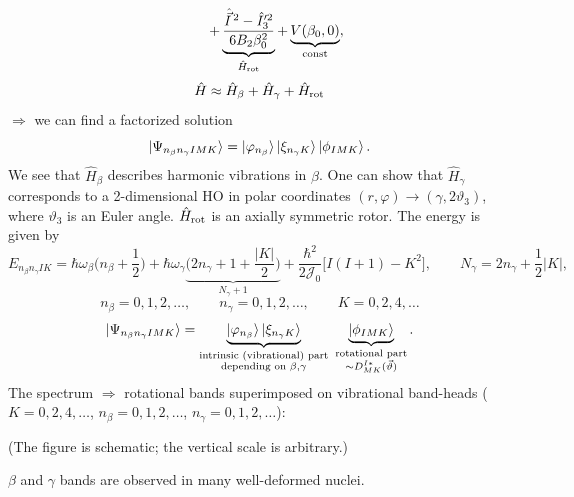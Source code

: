 \documentclass[11pt,a4paper]{article}
\newcommand{\op}[1]{\hat{#1}}
\begin{document}
\[
\qquad\ +\underbrace{\frac{\op{\vec I}^{\,2}-\op I'^2_3}{6B_2\beta_0^2}}_{\op H_{\rm rot}}+\underbrace{V(\beta_0,0)}_{\rm const},
\]
\[
\op H\approx\op H_\beta+\op H_\gamma+\op H_{\rm rot}
\]
$\Rightarrow$ we can find a factorized solution
\[
\ket{\Psi_{n_\beta n_\gamma IMK}}=\ket{\varphi_{n_\beta}}\ket{\xi_{n_\gamma K}}\ket{\phi_{IMK}} .
\]
We see that $\op H_\beta$ describes harmonic vibrations in $\beta$. One can show that $\op H_\gamma$ corresponds to a 2-dimensional HO in polar coordinates $(r,\varphi)\to(\gamma,2\vartheta_3)$, where $\vartheta_3$ is an Euler angle. $\op H_{\rm rot}$ is an axially symmetric rotor. The energy is given by
\[
E_{n_\beta n_\gamma IK}=\hbar\omega_\beta\Big(n_\beta+\frac12\Big)+\hbar\omega_\gamma\underbrace{\Big(2n_\gamma+1+\frac{|K|}{2}\Big)}_{N_\gamma+1}+\frac{\hbar^2}{2\mathcal J_0}\big[I(I+1)-K^2\big],
\qquad N_\gamma=2n_\gamma+\frac12|K|,
\]
\[
n_\beta=0,1,2,\dots,\qquad n_\gamma=0,1,2,\dots,\qquad K=0,2,4,\dots
\]
\[
\ket{\Psi_{n_\beta n_\gamma IMK}}=\underbrace{\ket{\varphi_{n_\beta}}\ket{\xi_{n_\gamma K}}}_{\substack{\text{intrinsic (vibrational) part}\\ \text{depending on }\beta,\gamma}}\ \underbrace{\ket{\phi_{IMK}}}_{\substack{\text{rotational part}\\ \sim D^{I*}_{MK}(\vec\vartheta)}} .
\]
The spectrum $\Rightarrow$ rotational bands superimposed on vibrational band-heads ($K=0,2,4,\dots$, $n_\beta=0,1,2,\dots$, $n_\gamma=0,1,2,\dots$):
\begin{center}
\end{center}
(The figure is schematic; the vertical scale is arbitrary.)

$\beta$ and $\gamma$ bands are observed in many well-deformed nuclei.
\end{document}
